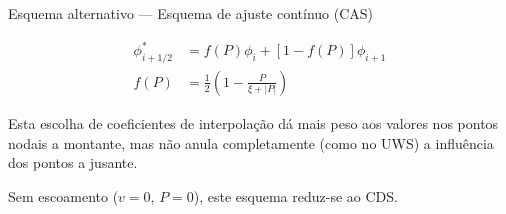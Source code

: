 \documentclass[final,t]{beamer}
\begin{document}
\begin{frame}{}
\begin{columns}[t]
\begin{column}{\linewidth}
\begin{exampleblock}{Esquema alternativo --- Esquema de ajuste contínuo
    (CAS)}
    \begin{minipage}[c]{0.25\linewidth}
        \begin{align*}
            \phi^*_{i+1/2} &= f(P)\phi_i + [1-f(P)]\phi_{i+1}\\[5mm]
            f(P) &= \frac{1}{2}\left(1-\frac{P}{\xi+|P|}\right)
        \end{align*}
    \end{minipage}\hfill
    \hfill
    \begin{minipage}[c]{0.4\linewidth}
        Esta escolha de coeficientes de interpolação dá mais peso aos valores
        nos pontos nodais a montante, mas não anula completamente (como no UWS)
        a influência dos pontos a jusante.

        Sem escoamento ($v=0$, $P=0$), este esquema reduz-se ao CDS.
    \end{minipage}
\end{exampleblock}


\end{column}
\end{columns}
\end{frame}
\end{document}

